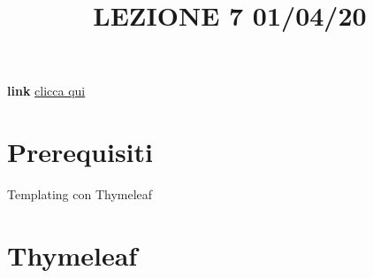 \title{LEZIONE 7 01/04/20}\newline
\textbf{link} \href{}{clicca qui}
\section*{Prerequisiti}
Templating con Thymeleaf
\section{Thymeleaf}